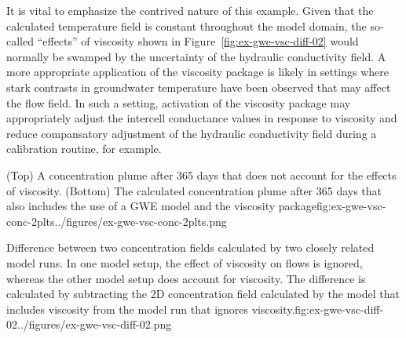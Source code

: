 It is vital to emphasize the contrived nature of this example.  Given that the calculated temperature field is constant throughout the model domain, the so-called ``effects'' of viscosity shown in Figure~\ref{fig:ex-gwe-vsc-diff-02} would normally be  swamped by the uncertainty of the hydraulic conductivity field.  A more appropriate application of the viscosity package is likely in settings where stark contrasts in groundwater temperature have been observed that may affect the flow field.  In such a setting, activation of the viscosity package may appropriately adjust the intercell conductance values in response to viscosity and reduce compansatory adjustment of the hydraulic conductivity field during a calibration routine, for example.


\begin{StandardFigure}{
   (Top) A concentration plume after 365 days that does not account for the effects of viscosity.  (Bottom) The calculated concentration plume after 365 days that also includes the use of a GWE model and the viscosity package}{fig:ex-gwe-vsc-conc-2plts}{../figures/ex-gwe-vsc-conc-2plts.png}
\end{StandardFigure}

\begin{StandardFigure}{
   Difference between two concentration fields calculated by two closely related model runs.  In one model setup, the effect of viscosity on flows is ignored, whereas the other model setup does account for viscosity.  The difference is calculated by subtracting the 2D concentration field calculated by the model that includes viscosity from the model run that ignores viscosity.}{fig:ex-gwe-vsc-diff-02}{../figures/ex-gwe-vsc-diff-02.png}
\end{StandardFigure}
